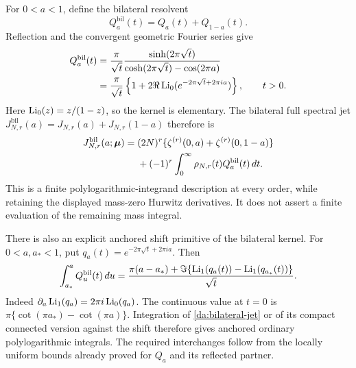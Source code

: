 For \(0<a<1\), define the bilateral resolvent
\[
 Q_a^{\mathrm{bil}}(t)=Q_a(t)+Q_{1-a}(t).
\]
Reflection and the convergent geometric Fourier series give
\begin{align}
 Q_a^{\mathrm{bil}}(t)
 &=\frac{\pi}{\sqrt t}
     \frac{\sinh(2\pi\sqrt t)}
          {\cosh(2\pi\sqrt t)-\cos(2\pi a)}\notag\\
 &=\frac{\pi}{\sqrt t}
       \left\{1+2\Re\operatorname{Li}_0(e^{-2\pi\sqrt t+2\pi ia})\right\},
             \qquad t>0. \label{da:bilateral-kernel}
\end{align}
Here \(\operatorname{Li}_0(z)=z/(1-z)\), so the kernel is elementary.
The bilateral full spectral jet
\(J_{N,r}^{\mathrm{bil}}(a)=J_{N,r}(a)+J_{N,r}(1-a)\) therefore is
\begin{align}
 J_{N,r}^{\mathrm{bil}}(a;\boldsymbol\mu)
 ={}&(2N)^r\{\zeta^{(r)}(0,a)+\zeta^{(r)}(0,1-a)\}\notag\\
 &+(-1)^r\int_0^\infty
          \rho_{N,r}(t)Q_a^{\mathrm{bil}}(t)\,d t.
 \label{da:bilateral-jet}
\end{align}
This is a finite polylogarithmic-integrand description at every order,
while retaining the displayed mass-zero Hurwitz derivatives. It does not
assert a finite evaluation of the remaining mass integral.

There is also an explicit anchored shift primitive of the bilateral
kernel. For \(0<a,a_*<1\), put \(q_a(t)=e^{-2\pi\sqrt t+2\pi ia}\). Then
\begin{equation}\label{da:bilateral-primitive}
 \int_{a_*}^{a}Q_u^{\mathrm{bil}}(t)\,d u
   =\frac{\pi(a-a_*)+
          \Im\{\operatorname{Li}_1(q_a(t))-\operatorname{Li}_1(q_{a_*}(t))\}}{\sqrt t}.
\end{equation}
Indeed \(\partial_a\operatorname{Li}_1(q_a)=2\pi i\operatorname{Li}_0(q_a)\).
The continuous value at \(t=0\) is
\(\pi\{\cot(\pi a_*)-\cot(\pi a)\}\).
Integration of \eqref{da:bilateral-jet} or of its compact connected
version against the shift therefore gives anchored ordinary
polylogarithmic integrals. The required interchanges follow from the
locally uniform bounds already proved for \(Q_a\) and its reflected
partner.
